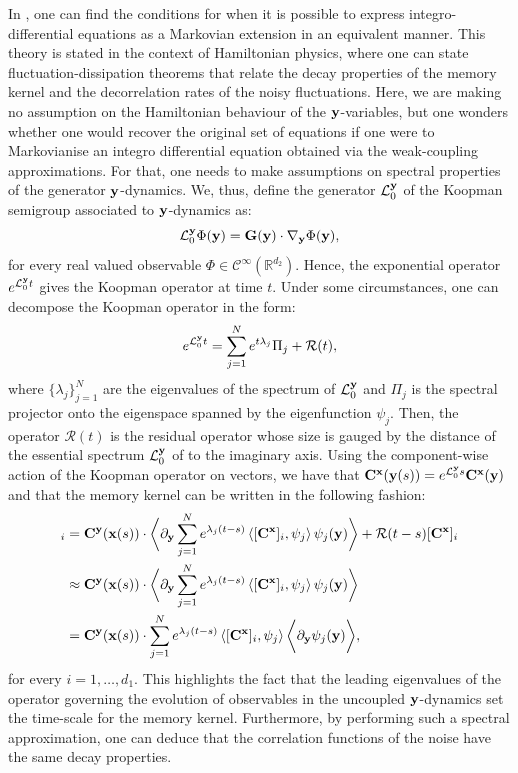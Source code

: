 \documentclass[12pt]{article}
\begin{document}
In \cite{pavliotisbook2014}, one can find the conditions for when it is possible to express integro-differential equations as a Markovian extension in an equivalent manner. This theory is stated in the context of Hamiltonian physics, where one can state fluctuation-dissipation theorems that relate the decay properties of the memory kernel and the decorrelation rates of the noisy fluctuations. Here, we are making no assumption on the Hamiltonian behaviour of the $\mathbf{y}$-variables, but one wonders whether one would recover the original set of equations if one were to Markovianise an integro differential equation obtained via the weak-coupling approximations. For that, one needs to make assumptions on spectral properties of the generator  $\mathbf{y}$-dynamics. We, thus, define the generator $\mathcal{L}^{\mathbf{y}} _0$ of the Koopman semigroup associated to $\mathbf{y}$-dynamics as:
\begin{equation}
\mathcal{L}_0^{\mathbf{y}}\Phi(\mathbf{y})=\mathbf{G}(\mathbf{y})\cdot \nabla_{\mathbf{y}}\Phi(\mathbf{y}),
\end{equation}
for every real valued observable $\Phi \in \mathcal{C}^{\infty}\left(\mathbb{R}^{d_2}\right)$. Hence, the exponential operator $e^{\mathcal{L}^{\mathbf{y}} _0 t}$ gives the Koopman operator at time $t$. Under some circumstances, one can decompose the Koopman operator in the form:
\begin{equation}
e^{\mathcal{L}^{\mathbf{y}} _0 t} = \sum _{j=1}^N e^{t\lambda _j}\Pi_j + \mathcal{R}(t),
\end{equation}
where $\{\lambda_j\}_{j=1}^{N}$ are the eigenvalues of the spectrum of $\mathcal{L}^{\mathbf{y}} _0$ and $\Pi _j$ is the spectral projector onto the eigenspace spanned by the eigenfunction $\psi _j$. Then, the operator $\mathcal{R}(t)$ is the residual operator whose size is gauged by the distance of the essential spectrum $\mathcal{L}^{\mathbf{y}} _0$ of  to the imaginary axis. Using the component-wise action of the Koopman operator on vectors, we have that $\mathbf{C} ^{\mathbf{x}}(\mathbf{y}(s))=e^{\mathcal{L}^{\mathbf{y}} _0 s}\mathbf{C} ^{\mathbf{x}}(\mathbf{y})$ and that the memory kernel can be written in the following fashion:
\begin{align}
	[\mathcal{K}(t,s,\xx)]_{i} &= \CCC^{\yy}(\xx(s))\cdot \bigg \langle \partial _{\yy}\sum_{j=1}^Ne^{\lambda_j (t-s)}\left\langle [\CCC ^{\xx}]_i,\psi_j \right\rangle \psi _j (\yy) \bigg \rangle + \mathcal{R}(t-s)[\CCC ^{\xx}]_i \\&\approx \CCC^{\yy}(\xx(s))\cdot \bigg \langle \partial _{\yy}\sum_{j=1}^Ne^{\lambda_j (t-s)}\left\langle [\CCC ^{\xx}]_i,\psi_j \right\rangle \psi _j (\yy)  \bigg \rangle \\ &=\CCC^{\yy}(\xx(s))\cdot  \sum_{j=1}^Ne^{\lambda_j (t-s)}\left\langle [\CCC ^{\xx}]_i,\psi_j \right\rangle\bigg \langle \partial _{\yy}\psi _j (\yy)  \bigg \rangle,
\end{align}
for every $i=1,\ldots,d_1$. This highlights the fact that the leading eigenvalues of the operator governing the evolution of observables in the uncoupled $\mathbf{y}$-dynamics set the time-scale for the memory kernel. Furthermore, by performing such a spectral approximation, one can deduce that the correlation functions of the noise have the same decay properties. 
\end{document}
